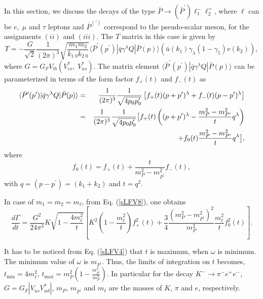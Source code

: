 \documentclass{ws-ijmpa}
\begin{document}
In this section, we discuss the decays of the type $\bar{P} \to (\bar{P}^{\prime})\ell^{-}_{1}\ell^{+}_2$, where $\ell$ can be $e,\; \mu$ and $\tau$ leptons and $\bar{P}^{(\prime)}$ correspond to the pseudo-scalar meson, for the assignments $(ii)$ and $(iii)$. The $T$ matrix in this case is given by
\begin{equation}
T = -\frac{G}{\sqrt{2}}\frac{1}{(2\pi)^3}\sqrt{\frac{m_{1}m_{2}}{k_{1\;0}k_{2\;0}}}\langle \bar{P}^{\prime}(p^{\prime})|\bar{q}\gamma^{\lambda}Q|\bar{P}(p)\rangle (\bar{u}(k_{1})\gamma_{\lambda}(1-\gamma_{5})v(k_2)) \label{sLFV1},
\end{equation}
where $G = G_{F}V_{tb}(V^{*}_{cs},\; V^{*}_{us})$. The matrix element $\langle \bar{P}^{\prime}(p^{\prime})|\bar{q}\gamma^{\lambda}Q|\bar{P}(p)\rangle$ can be parameterized in terms of the form factor $f_{+}(t)$ and $f_{-}(t)$ as
\begin{eqnarray}
\langle \bar{P}^{\prime}(p^{\prime})|\bar{q}\gamma^{\lambda}Q|\bar{P}(p)\rangle &=&\frac{1}{(2\pi)^3}\frac{1}{\sqrt{4p_{0}p^{\prime}_{0}}}\left[f_{+}(t)(p+p^{\prime})^{\lambda}+f_{-}(t)(p-p^{\prime})^{\lambda}\right]\notag \\
&=&\frac{1}{(2\pi)^3}\frac{1}{\sqrt{4p_{0}p^{\prime}_{0}}}\big[f_{+}(t)\left((p+p^{\prime})^{\lambda}-\frac{m^2_{P}-m^2_{P^{\prime}}}{t}q^{\lambda}\right)\notag\\
&&+f_{0}(t)\frac{m^2_{P}-m^2_{P^{\prime}}}{t}q^{\lambda}\big]\label{sLFV2},
\end{eqnarray}
where
\begin{equation}
f_{0}(t) = f_{+}(t)+\frac{t}{m^2_{P}-m^2_{P^{\prime}}}f_{-}(t)\label{sLFV3},
\end{equation}
with $q = (p-p^{\prime}) = (k_{1}+k_{2})$ and $t = q^2$.

In case of $m_1 = m_2 = m_{\ell}$, from Eq. (\ref{sLFV8}), one obtains
\begin{equation}
\frac{d\Gamma}{dt} = \frac{G^2}{24\pi^3}K\sqrt{1-\frac{4m^{2}_{\ell}}{t}}\left[K^2\left(1-\frac{m^2_{\ell}}{t}\right)f^2_{+}(t)+\frac{3}{4}\frac{(m^2_{P}-m^2_{P^{\prime}})^2}{m^2_{P}}\frac{m^2_{\ell}}{t}f^2_{0}(t)\right]\label{sLFV9}.
\end{equation}

It has to be noticed from Eq. (\ref{sLFV4}) that $t$ is maximum, when $\omega$ is minimum. The minimum value of $\omega$ is $m_{P^{\prime}}$. Thus, the limits of integration on $t$ becomes, $t_{\text{min}} = 4m^2_{\ell}$, $t_{\text{max}} = m^2_{P}\left(1-\frac{m^2_{P^{\prime}}}{m^2_{P}}\right)$. In particular for the decay $K^{-} \to \pi^{-}e^{+}e^{-}$, $G = G_{F}|V_{us}V^{*}_{ud}|$, $m_{P}$, $m_{P^{\prime}}$ and $m_{\ell}$ are the masses of $K$, $\pi$ and $e$, respectively.
\end{document}
